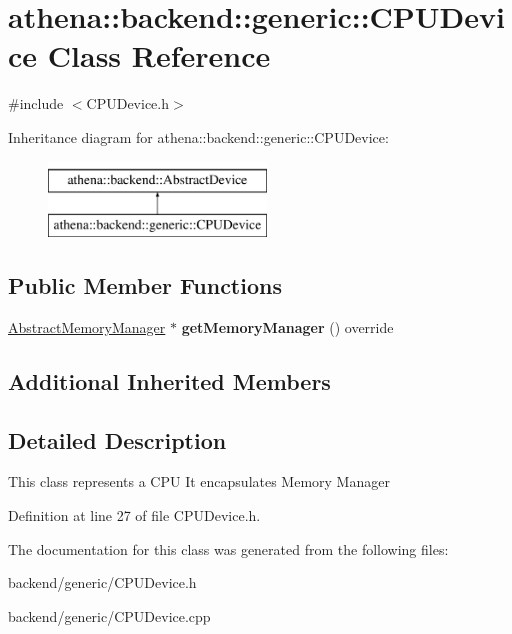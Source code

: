 \hypertarget{classathena_1_1backend_1_1generic_1_1_c_p_u_device}{}\section{athena\+:\+:backend\+:\+:generic\+:\+:C\+P\+U\+Device Class Reference}
\label{classathena_1_1backend_1_1generic_1_1_c_p_u_device}


{\ttfamily \#include $<$C\+P\+U\+Device.\+h$>$}

Inheritance diagram for athena\+:\+:backend\+:\+:generic\+:\+:C\+P\+U\+Device\+:\begin{figure}[H]
\begin{center}
\leavevmode
\includegraphics[height=2.000000cm]{db/d7b/classathena_1_1backend_1_1generic_1_1_c_p_u_device}
\end{center}
\end{figure}
\subsection*{Public Member Functions}
\begin{DoxyCompactItemize}
\item 
\mbox{\label{classathena_1_1backend_1_1generic_1_1_c_p_u_device_a813561ea04e66b4fc25c720242c70238}} 
\mbox{\hyperlink{classathena_1_1backend_1_1_abstract_memory_manager}{Abstract\+Memory\+Manager}} $\ast$ {\bfseries get\+Memory\+Manager} () override
\end{DoxyCompactItemize}
\subsection*{Additional Inherited Members}


\subsection{Detailed Description}
This class represents a C\+PU It encapsulates Memory Manager 

Definition at line 27 of file C\+P\+U\+Device.\+h.



The documentation for this class was generated from the following files\+:\begin{DoxyCompactItemize}
\item 
backend/generic/C\+P\+U\+Device.\+h\item 
backend/generic/C\+P\+U\+Device.\+cpp\end{DoxyCompactItemize}
